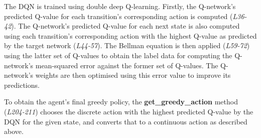 \documentclass[12pt]{article}
\begin{document}
The DQN is trained using double deep Q-learning. Firstly, the Q-network's predicted Q-value for each transition's corresponding action is computed (\textit{L36-42}). The Q-network's predicted Q-value for each next state is also computed using each transition's corresponding action with the highest Q-value as predicted by the target network (\textit{L44-57}). The Bellman equation is then applied (\textit{L59-72}) using the latter set of Q-values to obtain the label data for computing the Q-network's mean-squared error against the former set of Q-values. The Q-network's weights are then optimised using this error value to improve its predictions.

To obtain the agent's final greedy policy, the \textbf{get\_greedy\_action} method (\textit{L204-211}) chooses the discrete action with the highest predicted Q-value by the DQN for the given state, and converts that to a continuous action as described above.
\end{document}
